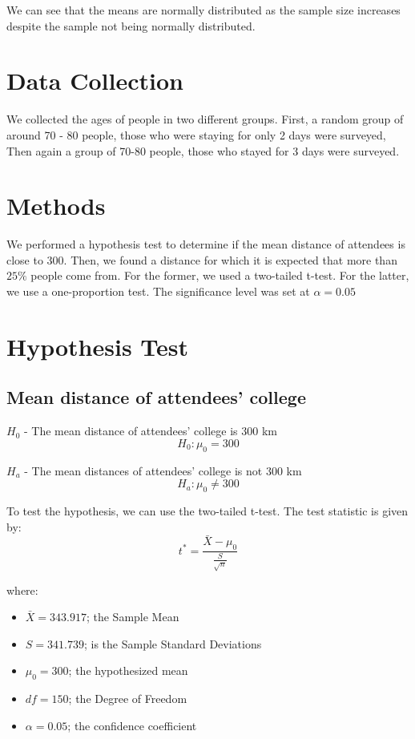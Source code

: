 \documentclass[oneside]{book}
\begin{document}
We can see that the means are normally distributed as the sample size increases despite the sample not being normally distributed.

\bigskip

\section{Data Collection}
We collected the ages of people in two different groups. First, a random group of around 70 - 80 people, those who were staying for only 2 days were surveyed, Then again a group of 70-80 people, those who stayed for 3 days were surveyed. 

\bigskip

\section{Methods}
We performed a hypothesis test to determine if the mean distance of attendees is close to 300. Then, we found a distance for which it is expected that more than $25\%$ people come from. For the former, we used a two-tailed t-test. For the latter, we use a one-proportion test. The significance level was set at $\alpha = 0.05$

\section{Hypothesis Test}

\subsection{Mean distance of attendees' college}
\begin{center}
\large $H_0$ - The mean distance of attendees' college is $300$ km
\[ H_0: \mu_0 = 300 \]
\end{center}
\begin{center}
\large $H_a$ - The mean distances of attendees' college is not $300$ km
\[ H_a: \mu_0 \neq 300 \]

\end{center}

To test the hypothesis, we can use the two-tailed t-test. The test statistic is given by:
\[ t^* = \frac{\bar{X} - \mu_0}{\frac{S}{\sqrt{n}}} \]

where:
\begin{itemize}
    \item $\bar{X} = 343.917$; the Sample Mean 
    \item $S = 341.739$; is the Sample Standard Deviations
    \item $\mu_0 = 300$; the hypothesized mean 
    \item $df = 150$; the Degree of Freedom
    \item $\alpha = 0.05$; the confidence coefficient
\end{itemize}
\end{document}

